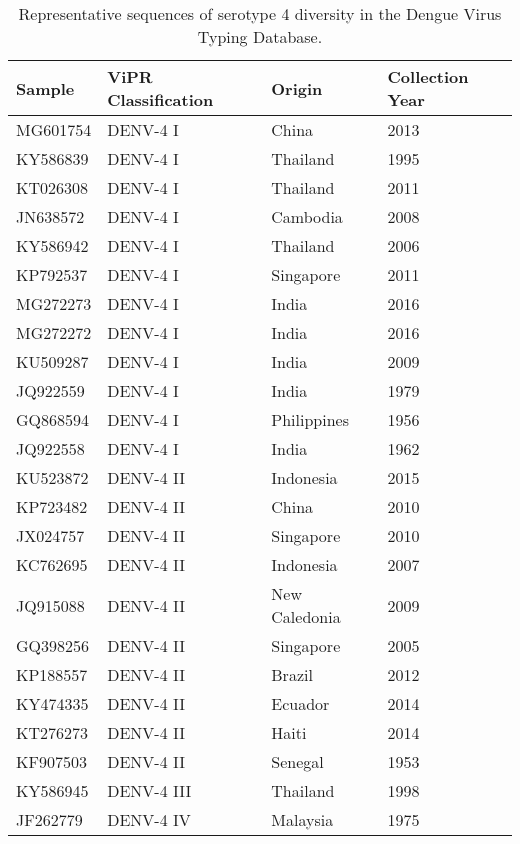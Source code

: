 \begin{longtable}{@{}llll@{}}
\caption{Representative sequences of serotype 4 diversity in the Dengue Virus Typing Database.}
\label{tab:chap4_s10}\\
\toprule
Sample   & ViPR Classification & Origin        & Collection Year \\\midrule
MG601754 & DENV-4 I            & China         & 2013            \\
KY586839 & DENV-4 I            & Thailand      & 1995            \\
KT026308 & DENV-4 I            & Thailand      & 2011            \\
JN638572 & DENV-4 I            & Cambodia      & 2008            \\
KY586942 & DENV-4 I            & Thailand      & 2006            \\
KP792537 & DENV-4 I            & Singapore     & 2011            \\
MG272273 & DENV-4 I            & India         & 2016            \\
MG272272 & DENV-4 I            & India         & 2016            \\
KU509287 & DENV-4 I            & India         & 2009            \\
JQ922559 & DENV-4 I            & India         & 1979            \\
GQ868594 & DENV-4 I            & Philippines   & 1956            \\
JQ922558 & DENV-4 I            & India         & 1962            \\
KU523872 & DENV-4 II           & Indonesia     & 2015            \\
KP723482 & DENV-4 II           & China         & 2010            \\
JX024757 & DENV-4 II           & Singapore     & 2010            \\
KC762695 & DENV-4 II           & Indonesia     & 2007            \\
JQ915088 & DENV-4 II           & New Caledonia & 2009            \\
GQ398256 & DENV-4 II           & Singapore     & 2005            \\
KP188557 & DENV-4 II           & Brazil        & 2012            \\
KY474335 & DENV-4 II           & Ecuador       & 2014            \\
KT276273 & DENV-4 II           & Haiti         & 2014            \\
KF907503 & DENV-4 II           & Senegal       & 1953            \\
KY586945 & DENV-4 III          & Thailand      & 1998            \\
JF262779 & DENV-4 IV           & Malaysia      & 1975           
\end{longtable}
